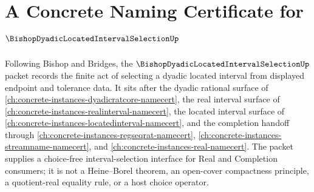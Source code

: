 \chapter{A Concrete Naming Certificate for $\BishopDyadicLocatedIntervalSelectionUp$}
\label{ch:concrete-instances-bishop-dyadic-located-interval-selection-namecert}

Following Bishop and Bridges, the $\BishopDyadicLocatedIntervalSelectionUp$ packet records the finite act of selecting a dyadic located interval from displayed endpoint and tolerance data. It sits after the dyadic rational surface of \autoref{ch:concrete-instances-dyadicratcore-namecert}, the real interval surface of \autoref{ch:concrete-instances-realinterval-namecert}, the located interval surface of \autoref{ch:concrete-instances-locatedinterval-namecert}, and the completion handoff through \autoref{ch:concrete-instances-regseqrat-namecert}, \autoref{ch:concrete-instances-streamname-namecert}, and \autoref{ch:concrete-instances-real-namecert}. The packet supplies a choice-free interval-selection interface for Real and Completion consumers; it is not a Heine--Borel theorem, an open-cover compactness principle, a quotient-real equality rule, or a host choice operator.


